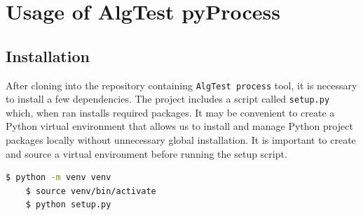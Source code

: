 \renewcommand{\thechapter}{A}
\chapter{Usage of AlgTest pyProcess}



\lstset{style=mystyle}

\section{Installation}
After cloning into the repository containing \texttt{AlgTest process} tool, it is necessary to install a few dependencies. The project includes a script called \texttt{setup.py} which, when ran installs required packages. It may be convenient to create a Python virtual environment that allows us to install and manage Python project packages locally without unnecessary global installation. It is important to create and source a virtual environment before running the setup script.
\begin{lstlisting}[language=bash]
    $ python -m venv venv
    $ source venv/bin/activate
    $ python setup.py
\end{lstlisting}

